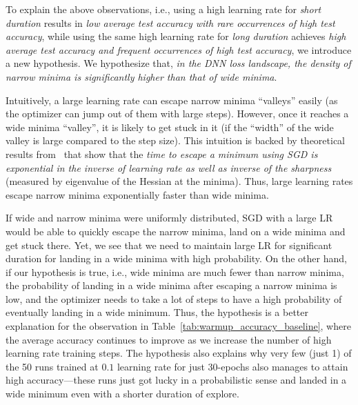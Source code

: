 \documentclass[twoside,11pt]{article}
\begin{document}
To explain the above observations, i.e., using a high learning rate for {\it short duration} results in {\it low average test accuracy with rare occurrences of high test accuracy}, while using the same high learning rate for {\it long duration} achieves {\it high average test accuracy and frequent occurrences of high test accuracy}, we introduce a new hypothesis. We hypothesize that, \textit{in the DNN loss landscape, the density of narrow minima is significantly  higher than that of wide minima}. 

Intuitively, a large learning rate can escape narrow minima ``valleys'' easily (as the optimizer can jump out of them with large steps). However, once it reaches a wide minima ``valley'', it is likely to get stuck in it (if the ``width'' of the wide valley is large compared to the step size). This intuition is backed by theoretical results from~\citet{xie2020diffusion} that show that the {\it time to escape a minimum using SGD is exponential in the inverse of learning rate as well as inverse of the sharpness} (measured by eigenvalue of the Hessian at the minima). Thus, large learning rates escape narrow minima exponentially faster than wide minima. 

If wide and narrow minima were uniformly distributed, SGD with a large LR would be able to quickly escape the narrow minima, land on a wide minima and get stuck there. Yet, we see that we need to maintain large LR for significant duration for landing in a wide minima with high probability. On the other hand, if our hypothesis is true, i.e., wide minima are much fewer than narrow minima, the probability of landing in a wide minima after escaping a narrow minima is low, and the optimizer needs to take a lot of steps to have a high probability of eventually landing in a wide minimum. Thus, the hypothesis is a better explanation for the observation in Table~\ref{tab:warmup_accuracy_baseline}, where the average accuracy continues to improve as we increase the number of high learning rate training steps. The hypothesis also explains why very few (just 1) of the 50 runs trained at $0.1$ learning rate for just 30-epochs also manages to attain high accuracy---these runs just got lucky in a  probabilistic sense and landed in a wide minimum even with a shorter duration of explore.
\end{document}
